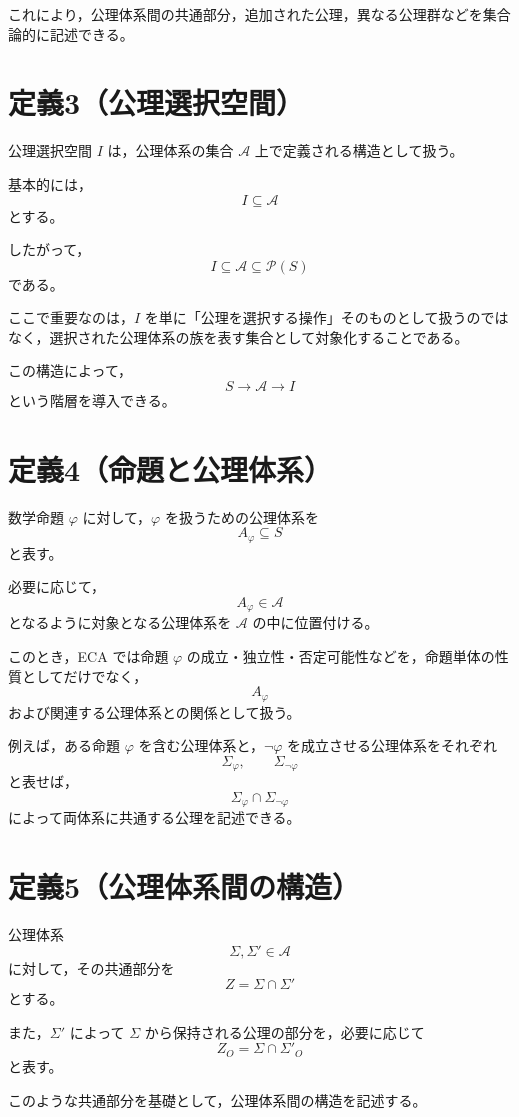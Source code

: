 \documentclass[a4paper,12pt]{article}
\begin{document}
これにより，公理体系間の共通部分，追加された公理，異なる公理群などを集合論的に記述できる。

\section{定義3（公理選択空間）}

公理選択空間 $I$ は，公理体系の集合 $\mathscr{A}$ 上で定義される構造として扱う。

基本的には，
\[
I\subseteq\mathscr{A}
\]
とする。

したがって，
\[
I\subseteq\mathscr{A}\subseteq\mathcal{P}(S)
\]
である。

ここで重要なのは，$I$ を単に「公理を選択する操作」そのものとして扱うのではなく，選択された公理体系の族を表す集合として対象化することである。

この構造によって，
\[
S
\longrightarrow
\mathscr{A}
\longrightarrow
I
\]
という階層を導入できる。

\section{定義4（命題と公理体系）}

数学命題 $\varphi$ に対して，$\varphi$ を扱うための公理体系を
\[
A_\varphi\subseteq S
\]
と表す。

必要に応じて，
\[
A_\varphi\in\mathscr{A}
\]
となるように対象となる公理体系を $\mathscr{A}$ の中に位置付ける。

このとき，ECA では命題 $\varphi$ の成立・独立性・否定可能性などを，命題単体の性質としてだけでなく，
\[
A_\varphi
\]
および関連する公理体系との関係として扱う。

例えば，ある命題 $\varphi$ を含む公理体系と，$\neg\varphi$ を成立させる公理体系をそれぞれ
\[
\Sigma_{\varphi},\qquad
\Sigma_{\neg\varphi}
\]
と表せば，
\[
\Sigma_{\varphi}\cap\Sigma_{\neg\varphi}
\]
によって両体系に共通する公理を記述できる。

\section{定義5（公理体系間の構造）}

公理体系
\[
\Sigma,\Sigma'\in\mathscr{A}
\]
に対して，その共通部分を
\[
Z=\Sigma\cap\Sigma'
\]
とする。

また，$\Sigma'$ によって $\Sigma$ から保持される公理の部分を，必要に応じて
\[
Z_O=\Sigma\cap\Sigma'_O
\]
と表す。

このような共通部分を基礎として，公理体系間の構造を記述する。
\end{document}
